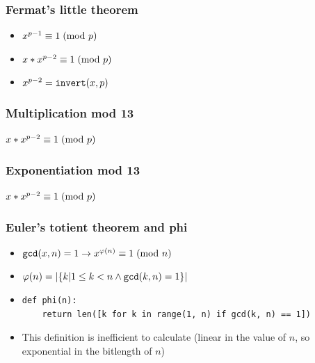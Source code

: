\documentclass{beamer}
\begin{document}
\begin{frame}[fragile]
\frametitle{Fermat's little theorem}
\begin{itemize}
\item $x^{p-1} \equiv 1\hspace{1mm}(\text{mod }p)$
\item $x*x^{p-2} \equiv 1\hspace{1mm}(\text{mod }p)$
\item $x^{p-2} = \verb|invert|(x, p)$
\end{itemize}
\end{frame}

\begin{frame}[fragile]
\frametitle{Multiplication mod 13}
$x*x^{p-2} \equiv 1\hspace{1mm}(\text{mod }p)$\\

\end{frame}

\begin{frame}[fragile]
\frametitle{Exponentiation mod 13}
$x*x^{p-2} \equiv 1\hspace{1mm}(\text{mod }p)$\\

\end{frame}

\begin{frame}[fragile]
\frametitle{Euler's totient theorem and phi}
\begin{itemize}
\item $\verb|gcd|(x, n) = 1 \rightarrow x^{\varphi(n)} \equiv 1\hspace{1mm}(\text{mod }n)$
\item $\varphi(n) = |\{k | 1 \le k < n \land \verb|gcd|(k, n) = 1\}|$
\item \begin{Verbatim}[fontsize=\scriptsize]
def phi(n):
    return len([k for k in range(1, n) if gcd(k, n) == 1])
\end{Verbatim}
\item This definition is inefficient to calculate (linear in the value of $n$, so exponential in the bitlength of $n$)
\end{itemize}
\end{frame}
\end{document}
